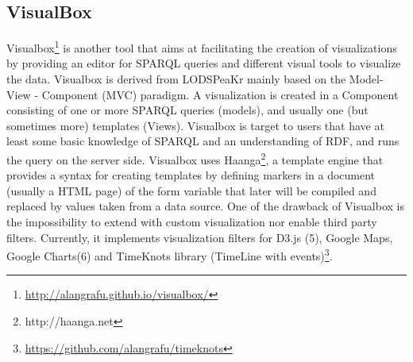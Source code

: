 
\subsection{VisualBox}

Visualbox\footnote{\url{http://alangrafu.github.io/visualbox/}} is another tool that aims at facilitating the creation of visualizations by providing an editor for SPARQL queries and different 
visual tools to visualize the data. Visualbox is derived from LODSPeaKr \cite{graves13} mainly based on the Model- View - Component (MVC) paradigm. A visualization is created in a Component consisting of one or more SPARQL queries (models), and usually one (but sometimes more) templates (Views).
Visualbox is target to users that have at least some basic knowledge of SPARQL and an understanding of RDF, and runs the query on the server side. Visualbox uses Haanga\footnote{http://haanga.net}, a template engine that provides a syntax for creating templates by defining markers in a document (usually a HTML page) of the form {{variable}} that later will be compiled and replaced by values taken from a data source. One of the drawback of Visualbox is the impossibility to extend with custom visualization nor enable third party filters.
Currently, it implements visualization filters for D3.js (5), Google Maps, Google Charts(6) and TimeKnots library (TimeLine with events)\footnote{\url{https://github.com/alangrafu/timeknots}}.

